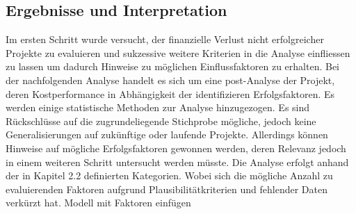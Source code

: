 \subsection{Ergebnisse und Interpretation}
Im ersten Schritt wurde versucht, der finanzielle Verlust nicht erfolgreicher Projekte zu evaluieren und sukzessive weitere Kriterien in die Analyse einfliessen zu lassen um dadurch Hinweise zu möglichen Einflussfaktoren zu erhalten. Bei der nachfolgenden Analyse handelt es sich um eine post-Analyse der Projekt, deren Kostperformance in Abhängigkeit der identifizieren Erfolgsfaktoren. Es werden einige statistische Methoden zur Analyse hinzugezogen. Es sind Rückschlüsse auf die zugrundeliegende Stichprobe mögliche, jedoch keine Generalisierungen auf zukünftige oder laufende Projekte. Allerdings können Hinweise auf mögliche Erfolgsfaktoren gewonnen werden, deren Relevanz jedoch in einem weiteren Schritt untersucht werden müsste. Die Analyse erfolgt anhand der in Kapitel 2.2 definierten Kategorien. Wobei sich die mögliche Anzahl zu evaluierenden Faktoren aufgrund Plausibilitätkriterien und fehlender Daten verkürzt hat.
\newline Modell mit Faktoren einfügen\newline
